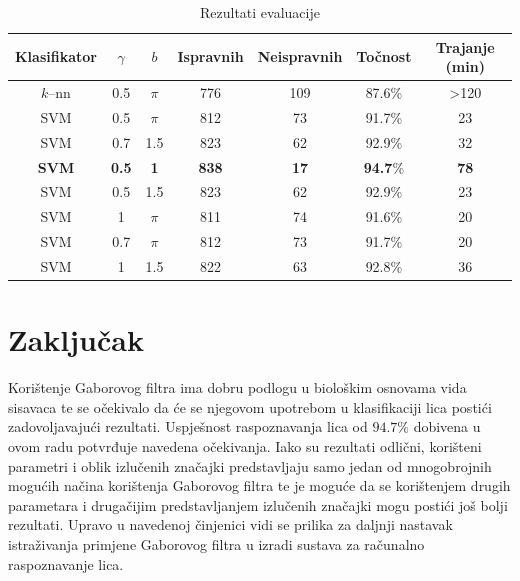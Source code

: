 \documentclass{ru}
\begin{document}
\begin{table}[ht]
\caption{Rezultati evaluacije}
\centering
\begin{tabular}{c c c c c c c}
\hline\hline
Klasifikator & $\gamma$ & $b$ & Ispravnih & Neispravnih &
Točnost & Trajanje (min) \\ [0.5ex]
\hline
$k$--nn & 0.5 & $\pi$ & 776 & 109 & 87.6\% & >120 \\
SVM & 0.5 & $\pi$ & 812  & 73 & 91.7\% & 23 \\
SVM & 0.7 & 1.5 & 823  & 62 & 92.9\% & 32\\
\textbf{SVM} & \textbf{0.5} & \textbf{1} & \textbf{838}  & \textbf{17} & \textbf{94.7}\% & \textbf{78}\\
SVM & 0.5 & 1.5 & 823  & 62 & 92.9\% & 23\\
SVM & 1 & $\pi$ & 811  & 74 & 91.6\% & 20\\
SVM & 0.7 & $\pi$ & 812  & 73 & 91.7\% & 20\\
SVM & 1 & 1.5 & 822  & 63 & 92.8\% & 36\\ [1ex]
\hline
\end{tabular}
\label{tbl:eval}
\end{table}

\chapter{Zaključak}

Korištenje Gaborovog filtra ima dobru podlogu u biološkim osnovama vida
sisavaca te se očekivalo da će se njegovom upotrebom u klasifikaciji lica
postići zadovoljavajući rezultati. Uspješnost raspoznavanja lica od $94.7\%$
dobivena u ovom radu potvrđuje navedena očekivanja. Iako su rezultati
odlični, korišteni parametri i oblik izlučenih značajki predstavljaju
samo jedan od mnogobrojnih mogućih načina korištenja Gaborovog filtra te je
moguće da se korištenjem drugih parametara i drugačijim predstavljanjem
izlučenih značajki mogu postići još bolji rezultati. Upravo u navedenoj
činjenici vidi se prilika za daljnji nastavak istraživanja primjene Gaborovog
filtra u izradi sustava za računalno raspoznavanje lica.



\end{document}
